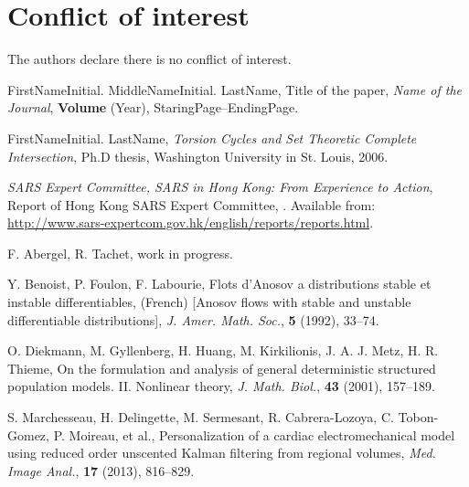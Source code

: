 \documentclass{aims}
\numberwithin{equation}{section}
\begin{document}
\section*{Conflict of interest}

The authors declare there is no conflict of interest.

\begin{thebibliography}{99}


     \newblock  FirstNameInitial.  MiddleNameInitial. LastName, %
     \newblock Title of the paper,
     \newblock \emph{Name of the Journal}, \textbf{Volume} (Year), StaringPage--EndingPage.

    \newblock FirstNameInitial. LastName,
    \newblock  \emph{Torsion Cycles and Set Theoretic Complete Intersection},
    \newblock  Ph.D thesis, Washington University in St. Louis, 2006.

\emph{SARS Expert Committee, SARS in Hong Kong: From Experience to
Action}, Report of Hong Kong SARS Expert Committee,
. Available from: \url{http://www.sars-expertcom.gov.hk/english/reports/reports.html}.

\newblock F. Abergel, R. Tachet,
\newblock
\newblock work in progress.

    \newblock Y. Benoist, P. Foulon, F. Labourie, %
    \newblock Flots d'Anosov a distributions stable et instable
     differentiables,
    \newblock (French) [Anosov flows with stable and unstable differentiable
     distributions], \emph{J. Amer. Math. Soc.}, \textbf{5} (1992), 33--74.

\newblock  O. Diekmann, M. Gyllenberg, H. Huang, M. Kirkilionis, J. A. J. Metz, H. R. Thieme, 
\newblock On the formulation and analysis of general deterministic structured population models. II. Nonlinear theory, 
\emph{J. Math. Biol.}, \textbf{43} (2001), 157--189.

 S. Marchesseau, H. Delingette, M. Sermesant, R. Cabrera-Lozoya, C. Tobon-Gomez, P. Moireau, et al., 
\newblock Personalization of a cardiac electromechanical model using reduced order unscented Kalman filtering from regional volumes, \emph{Med. Image Anal.}, \textbf{17} (2013), 816--829.


\end{thebibliography}
\end{document}
